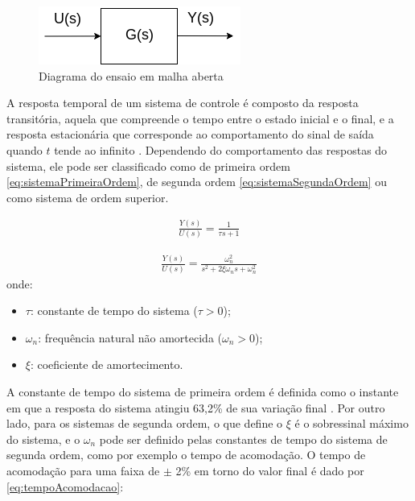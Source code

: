 \begin{figure}[ht]
  \centering
  \includegraphics[width = 0.4\columnwidth]{Imagens/diagEnsaioMA.png}
  \caption{Diagrama do ensaio em malha aberta}
  \label{fig:diagEnsaioMA} 
\end{figure}

A resposta temporal de um sistema de controle é composto da resposta transitória, aquela que compreende o tempo entre o 
estado inicial e o final, e a resposta estacionária que corresponde ao comportamento do sinal de saída quando $t$
tende ao infinito \cite{Ogata}. Dependendo do comportamento das respostas do sistema, ele pode ser classificado
como de primeira ordem \eqref{eq:sistemaPrimeiraOrdem}, de segunda ordem \eqref{eq:sistemaSegundaOrdem} ou como sistema 
de ordem superior.

\begin{equation}
  \begin{gathered}
    \frac{Y(s)}{U(s)} = \frac{1}{\tau s + 1}
  \end{gathered}
  \label{eq:sistemaPrimeiraOrdem}
\end{equation}

\begin{equation}
  \begin{gathered}
    \frac{Y(s)}{U(s)} = \frac{\omega_n^2}{s^2 + 2\xi \omega_n s + \omega_n^2}
  \end{gathered}
  \label{eq:sistemaSegundaOrdem}
\end{equation}
onde:

\begin{itemize}
 \item $\tau$: constante de tempo do sistema ($\tau > 0$);
 \item $\omega_n$: frequência natural não amortecida ($\omega_n > 0$);
 \item $\xi$: coeficiente de amortecimento.
\end{itemize}

A constante de tempo do sistema de primeira ordem é definida como o instante em que a resposta 
do sistema atingiu 63,2\% de sua variação final \cite{Castrucci}. Por outro lado, para os sistemas de
segunda ordem, o que define o $\xi$ é o sobressinal máximo do sistema, e o $\omega_n$ pode ser definido
pelas constantes de tempo do sistema de segunda ordem, como por exemplo o tempo de 
acomodação. O tempo de acomodação para uma faixa de $\pm$ 2\% em torno do valor final é dado 
por \eqref{eq:tempoAcomodacao}:


